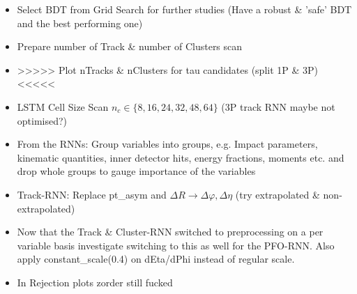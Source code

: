 \begin{itemize}
\item Select BDT from Grid Search for further studies (Have a robust \& 'safe'
  BDT and the best performing one)
\item Prepare number of Track \& number of Clusters scan
\item >>>>> Plot nTracks \& nClusters for tau candidates (split 1P \& 3P) <<<<<
\item LSTM Cell Size Scan $n_c \in \{8, 16, 24, 32, 48, 64\}$ (3P track RNN
  maybe not optimised?)
\item From the RNNs: Group variables into groups, e.g. Impact parameters,
  kinematic quantities, inner detector hits, energy fractions, moments etc. and
  drop whole groups to gauge importance of the variables
\item Track-RNN: Replace pt\_asym and $\Delta R \rightarrow \Delta\varphi,
  \Delta\eta$ (try extrapolated \& non-extrapolated)
\item Now that the Track \& Cluster-RNN switched to preprocessing on a per
  variable basis investigate switching to this as well for the PFO-RNN. Also
  apply constant\_scale(0.4) on dEta/dPhi instead of regular scale.
\item In Rejection plots zorder still fucked
\end{itemize}



